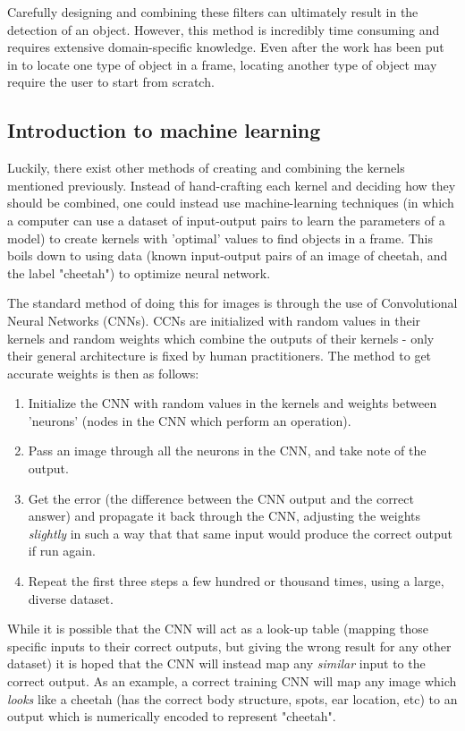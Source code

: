 Carefully designing and combining these filters can ultimately result in the detection of an object. However, this method is incredibly time consuming and requires extensive domain-specific knowledge. Even after the work has been put in to locate one type of object in a frame, locating another type of object may require the user to start from scratch.

\subsection{Introduction to machine learning}

Luckily, there exist other methods of creating and combining the kernels mentioned previously. Instead of hand-crafting each kernel and deciding how they should be combined, one could instead use machine-learning techniques (in which a computer can use a dataset of input-output pairs to learn the parameters of a model) to create kernels with 'optimal' values to find objects in a frame. This boils down to using data (known input-output pairs of an image of cheetah, and the label "cheetah") to optimize neural network.

The standard method of doing this for images is through the use of Convolutional Neural Networks (CNNs). CCNs are initialized with random values in their kernels and random weights which combine the outputs of their kernels - only their general architecture is fixed by human practitioners. The method to get accurate weights is then as follows:

\begin{enumerate}
\item Initialize the CNN with random values in the kernels and weights between 'neurons' (nodes in the CNN which perform an operation).
\item Pass an image through all the neurons in the CNN, and take note of the output.
\item Get the error (the difference between the CNN output and the correct answer) and propagate it back through the CNN, adjusting the weights \emph{slightly} in such a way that that same input would produce the correct output if run again.
\item Repeat the first three steps a few hundred or thousand times, using a large, diverse dataset.
\end{enumerate}

While it is possible that the CNN will act as a look-up table (mapping those specific inputs to their correct outputs, but giving the wrong result for any other dataset) it is hoped that the CNN will instead map any \emph{similar} input to the correct output. As an example, a correct training CNN will map any image which \emph{looks} like a cheetah (has the correct body structure, spots, ear location, etc) to an output which is numerically encoded to represent "cheetah".

